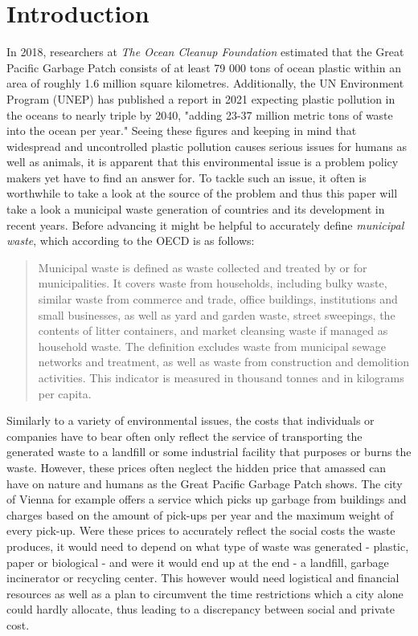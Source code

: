 \documentclass[12pt,a4paper]{article}
\begin{document}
\section{Introduction}
In 2018, researchers at \textit{The Ocean Cleanup Foundation} estimated that the Great Pacific Garbage Patch consists of at least 79 000 tons of ocean plastic within an area of roughly 1.6 million square kilometres. \parencite{lebreton2018} Additionally, the UN Environment Program (UNEP) has published a report in 2021 expecting plastic pollution in the oceans to nearly triple by 2040, "adding 23-37 million metric tons of waste into the ocean per year." \cite{UN REPORT} Seeing these figures and keeping in mind that widespread and uncontrolled plastic pollution causes serious issues for humans as well as animals, it is apparent that this environmental issue is a problem policy makers yet have to find an answer for. To tackle such an issue, it often is worthwhile to take a look at the source of the problem and thus this paper will take a look a municipal waste generation of countries and its development in recent years. Before advancing it might be helpful to accurately define \textit{municipal waste}, which according to the OECD is as follows:

\begin{quote}
Municipal waste is defined as waste collected and treated by or for municipalities. It covers waste from households, including bulky waste, similar waste from commerce and trade, office buildings, institutions and small businesses, as well as yard and garden waste, street sweepings, the contents of litter containers, and market cleansing waste if managed as household waste. The definition excludes waste from municipal sewage networks and treatment, as well as waste from construction and demolition activities. This indicator is measured in thousand tonnes and in kilograms per capita. \parencite{OECDData}
\end{quote}

Similarly to a variety of environmental issues, the costs that individuals or companies have to bear often only reflect the service of transporting the generated waste to a landfill or some industrial facility that purposes or burns the waste. However, these prices often neglect the hidden price that amassed can have on nature and humans as the Great Pacific Garbage Patch shows. The city of Vienna for example offers a service which picks up garbage from buildings and charges based on the amount of pick-ups per year and the maximum weight of every pick-up. \parencite{MA48} Were these prices to accurately reflect the social costs the waste produces, it would need to depend on what type of waste was generated - plastic, paper or biological - and were it would end up at the end - a landfill, garbage incinerator or recycling center. This however would need logistical and financial resources as well as a plan to circumvent the time restrictions which a city alone could hardly allocate, thus leading to a discrepancy between social and private cost. 
\end{document}

